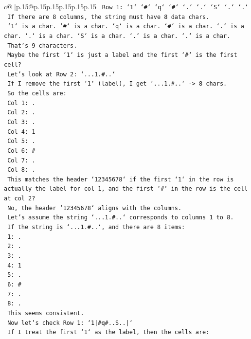 \documentclass{article}
\begin{document}
{\begin{supertabular}{c@{$\;$}|p{.15\linewidth}@{}p{.15\linewidth}p{.15\linewidth}p{.15\linewidth}p{.15\linewidth}p{.15\linewidth}}
{{{\texttt{   Row 1: `1` `\#` `q` `\#` `.` `.` `S` `.` `.`} \\
\texttt{   If there are 8 columns, the string must have 8 data chars.} \\
\texttt{   `1` is a char. `\#` is a char. `q` is a char. `\#` is a char. `.` is a char. `.` is a char. `S` is a char. `.` is a char. `.` is a char.} \\
\texttt{   That's 9 characters.} \\
\texttt{   Maybe the first `1` is just a label and the first `\#` is the first cell?} \\
\texttt{   Let's look at Row 2: `...1.\#..`} \\
\texttt{   If I remove the first `1` (label), I get `...1.\#..` {-}> 8 chars.} \\
\texttt{   So the cells are:} \\
\texttt{   Col 1: .} \\
\texttt{   Col 2: .} \\
\texttt{   Col 3: .} \\
\texttt{   Col 4: 1} \\
\texttt{   Col 5: .} \\
\texttt{   Col 6: \#} \\
\texttt{   Col 7: .} \\
\texttt{   Col 8: .} \\
\texttt{   This matches the header `12345678` if the first `1` in the row is actually the label for col 1, and the first `\#` in the row is the cell at col 2?} \\
\texttt{   No, the header `12345678` aligns with the columns.} \\
\texttt{   Let's assume the string `...1.\#..` corresponds to columns 1 to 8.} \\
\texttt{   If the string is `...1.\#..`, and there are 8 items:} \\
\texttt{   1: .} \\
\texttt{   2: .} \\
\texttt{   3: .} \\
\texttt{   4: 1} \\
\texttt{   5: .} \\
\texttt{   6: \#} \\
\texttt{   7: .} \\
\texttt{   8: .} \\
\texttt{   This seems consistent.} \\
\texttt{   Now let's check Row 1: `1|\#q\#..S..|`} \\
\texttt{   If I treat the first `1` as the label, then the cells are:} \\
}}}
\end{supertabular}}
\end{document}

